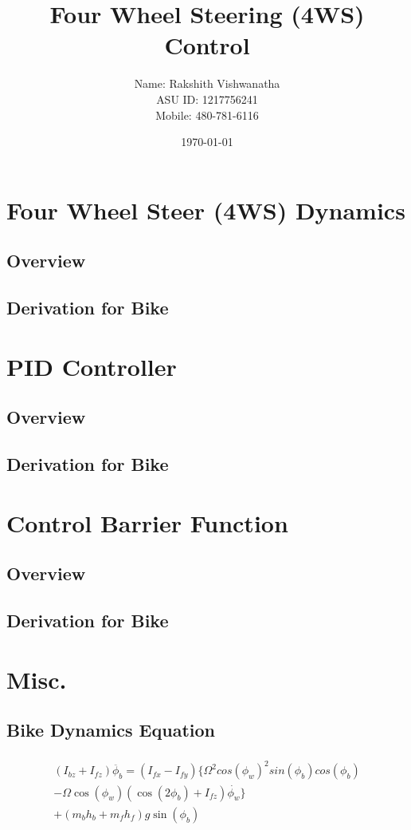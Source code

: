 \documentclass[journal, onecolumn]{IEEEtran} %
\title{Four Wheel Steering (4WS) Control}
\author{Name: Rakshith Vishwanatha \\ ASU ID: 1217756241 \\ Mobile: 480-781-6116}
\date{\today}
\begin{document}
\maketitle

\section{Four Wheel Steer (4WS) Dynamics}
\subsection{Overview}
\subsection{Derivation for Bike}


\section{PID Controller}
\subsection{Overview}
\subsection{Derivation for Bike}


\section{Control Barrier Function}
\subsection{Overview}
\subsection{Derivation for Bike}



\section{Misc.}
\subsection{Bike Dynamics Equation}

\begin{eqnarray}
    \begin{aligned}
        (I_{bz} + I_{fz}) \ddot{\phi_b} = 
        (I_{fx} - I_{fy}) \{ 
        {\Omega}^2 {cos(\phi_w)}^2 sin(\phi_b) cos(\phi_b) \\
        -\Omega \cos(\phi_w)(\cos(2\phi_b) + I_{fz})\dot{\phi_w} \} \\
        + (m_b h_b + m_f h_f) g \sin(\phi_b)
    \end{aligned}
\end{eqnarray}
\end{document}
